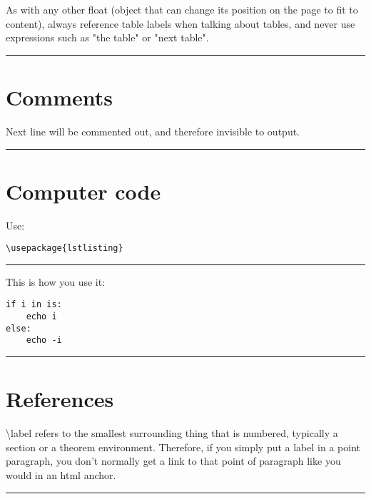 \documentclass[12pt]{article}
\newcommand{\inOut}[1]{#1} %
\begin{document}
\begin{remark} \label{remTab3}
  As with any other float (object that can change its position on the page to fit to content), always reference table labels when talking about tables, and never use expressions such as "the table" or "next table".
\end{remark}\hrule

\section{Comments}\label{secCom}

\begin{example} \label{expCom1}
		Next line will be commented out, and therefore invisible to output.
		\begin{comment}
		This line was commented off.
		\end{comment}
\end{example}\hrule

\section{Computer code}\label{secCode}

\begin{remark} \label{remCode1}
  Use:
  \begin{lstlisting}
\usepackage{lstlisting}
  \end{lstlisting}
\end{remark}\hrule

\begin{example} \label{expCom1}
  This is how you use it:
		\begin{lstlisting}
if i in is:
    echo i
else:
    echo -i
		\end{lstlisting}
\end{example}\hrule

\section{References}\label{secRef}

\begin{remark} \label{remLab1}
	\textbackslash{}label refers to the smallest surrounding thing that is numbered, typically a section or a theorem environment. Therefore, if you simply put a label in a point paragraph, you don't normally get a link to that point of paragraph like you would in an html anchor.
\end{remark}\hrule
\end{document}
